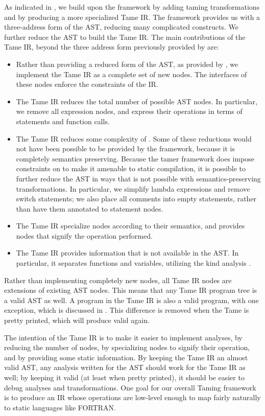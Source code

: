 As indicated in , we build upon the \mcsaf framework by
adding taming transformations and by producing a more specialized Tame IR.
The \mcsaf framework provides us with a three-address form of the AST, reducing many
complicated \matlab constructs. We further reduce the AST to build
the Tame IR. The main contributions of the Tame IR, beyond the
three address form previously provided by \mcsaf are:

\begin{itemize}
\item Rather than providing a reduced form of the AST, as provided
by \mcsaf, we implement the Tame IR as a complete set of new
nodes. The interfaces of these nodes enforce the constraints of the IR.
\item The Tame IR reduces the total number of possible
AST nodes. In particular, we remove all expression nodes, and express
their operations in terms of statements and function calls.
\item The Tame IR reduces some complexity of \matlab. Some
of these reductions would not have been possible to be provided
by the \mcsaf framework, because it is completely semantics
preserving. Because the tamer framework does impose constraints
on \matlab to make it amenable to static compilation, it
is possible to further reduce the AST in ways that is
not possible with semantics-preserving transformations. In particular, we
simplify lambda expressions and remove switch statements;
we also place all comments into empty statements, rather
than have them annotated to statement nodes.
\item The Tame IR specialize nodes according to their semantics,
and provides nodes that signify the operation performed.
\item The Tame IR provides information that is not available in 
the AST. In particular, it separates functions and variables,
utilizing the kind analysis \cite{KindAnalysis}.
\end{itemize}

Rather than implementing completely new nodes, all Tame IR nodes are
extensions of existing AST nodes. This means that any Tame IR program
tree is a valid AST as well. A program in the Tame IR is also a
valid \matlab program, with one exception, which is discussed
in . This difference is removed when the Tame
is pretty printed, which will produce valid \matlab again.

The intention of the Tame IR is to make it easier to implement
analyses, by reducing the number of nodes, by specializing nodes to
signify their operation, and by providing some static information. By
keeping the Tame IR an almost valid AST, any analysis written for the
AST should work for the Tame IR as well; by keeping it valid \matlab
(at least when pretty printed), it should be easier to debug analyses
and transformations. One goal for our overall Taming framework is to
produce an IR whose operations are low-level enough to map fairly
naturally to static languages like {\sc FORTRAN}.

